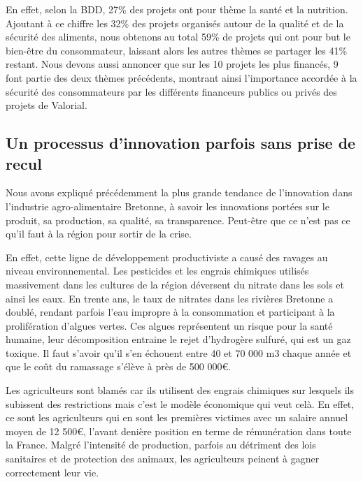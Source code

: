 \documentclass[a4paper,12pt]{report}
\begin{document}
			En effet, selon la BDD, 27\% des projets ont pour thème la santé et la nutrition. Ajoutant à ce chiffre les 32\% des projets  organisés autour de la qualité et de la sécurité des aliments, nous obtenons au total 59\% de projets qui ont pour but le bien-être du consommateur, laissant alors les autres thèmes se partager les 41\% restant. Nous devons aussi annoncer que sur les 10 projets les plus financés, 9 font partie des deux thèmes précédents, montrant ainsi l’importance accordée à la sécurité des consommateurs par les différents financeurs publics ou privés des projets de Valorial.
						
		\subsection{Un processus d'innovation parfois sans prise de recul}
			
			Nous avons expliqué précédemment la plus grande tendance de l’innovation dans l’industrie agro-alimentaire Bretonne, à savoir les innovations portées sur le produit, sa production, sa qualité, sa transparence. Peut-être que ce n’est pas ce qu’il faut à la région pour sortir de la crise.
			
			En effet, cette ligne de développement productiviste a causé des ravages au niveau environnemental. Les pesticides et les engrais chimiques utilisés massivement dans les cultures de la région déversent du nitrate dans les sols et ainsi les eaux. En trente ans, le taux de nitrates dans les rivières Bretonne a doublé, rendant parfois l’eau impropre à la consommation et participant à la prolifération d’algues vertes\cite{NitratesAlguesVertesBretagne}. Ces algues représentent un risque pour la santé humaine, leur décomposition entraine le rejet d’hydrogère sulfuré, qui est un gaz toxique. Il faut s’avoir qu’il s’en échouent entre 40 et 70 000 m3 chaque année et que le coût du ramassage s’élève à près de 500 000\euro.
			
			Les agriculteurs sont blamés car ils utilisent des engrais chimiques sur lesquels ils subissent des restrictions mais c’est le modèle économique qui veut celà. En effet, ce sont les agriculteurs qui en sont les premières victimes avec un salaire annuel moyen de 12 500\euro, l’avant denière position en terme de rémunération dans toute la France\cite{AlguesVertesNouvellePreuveRavagesProductivismeAgricole}. Malgré l’intensité de production, parfois au détriment des lois sanitaires et de protection des animaux, les agriculteurs peinent à gagner correctement leur vie.
			
\end{document}
